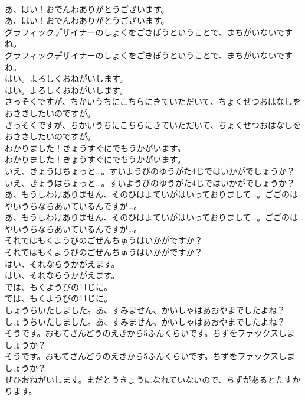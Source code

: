 \documentclass[8pt]{extreport}
\begin{document}
\begin{CJK}{UTF8}{min}
\\	あ、はい！おでんわありがとうございます。	
\\	あ、はい！おでんわありがとうございます。 
\\	グラフィックデザイナーのしょくをごきぼうということで、まちがいないですね。	
\\	グラフィックデザイナーのしょくをごきぼうということで、まちがいないですね。 
\\	はい。よろしくおねがいします。	
\\	はい。よろしくおねがいします。 
\\	さっそくですが、ちかいうちにこちらにきていただいて、ちょくせつおはなしをおききしたいのですが。	
\\	さっそくですが、ちかいうちにこちらにきていただいて、ちょくせつおはなしをおききしたいのですが。 
\\	わかりました！きょうすぐにでもうかがいます。	
\\	わかりました！きょうすぐにでもうかがいます。 
\\	いえ、きょうはちょっと…。すいようびのゆうがた4じではいかがでしょうか？	
\\	いえ、きょうはちょっと…。すいようびのゆうがた4じではいかがでしょうか？ 
\\	あ、もうしわけありません、そのひはよていがはいっておりまして…。ごごのはやいうちならあいているんですが…。	
\\	あ、もうしわけありません、そのひはよていがはいっておりまして…。ごごのはやいうちならあいているんですが…。 
\\	それではもくようびのごぜんちゅうはいかがですか？	
\\	それではもくようびのごぜんちゅうはいかがですか？ 
\\	はい、それならうかがえます。	
\\	はい、それならうかがえます。 
\\	では、もくようびの11じに。	
\\	では、もくようびの11じに。 
\\	しょうちいたしました。あ、すみません、かいしゃはあおやまでしたよね？	
\\	しょうちいたしました。あ、すみません、かいしゃはあおやまでしたよね？ 
\\	そうです。おもてさんどうのえきから5ふんくらいです。ちずをファックスしましょうか？	
\\	そうです。おもてさんどうのえきから5ふんくらいです。ちずをファックスしましょうか？ 
\\	ぜひおねがいします。まだとうきょうになれていないので、ちずがあるとたすかります。	

\end{CJK}
\end{document}
